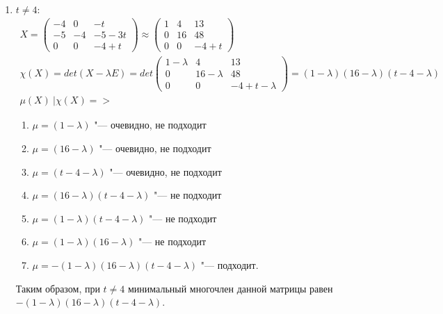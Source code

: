 \begin{enumerate}
    \item $t \ne 4:$
        \begin{gather*}
            X = \begin{pmatrix}
                -4 & 0 & -t\\
                -5 & -4 & -5-3t\\
                0 & 0 & -4+t
            \end{pmatrix} \approx \begin{pmatrix}
                1 & 4 & 13\\
                0 & 16 & 48\\
                0 & 0 & -4+t
            \end{pmatrix}\\
            \chi(X) = det(X - \lambda E) = det\begin{pmatrix}
                1- \lambda & 4 & 13\\
                0 & 16 - \lambda & 48\\
                0 & 0 & -4+t - \lambda
            \end{pmatrix} = (1 - \lambda)(16 - \lambda)(t-4-\lambda)\\
            \mu(X) \ | \chi(X) =>
        \end{gather*}
        \begin{enumerate}
            \item $\mu = (1 - \lambda)$ "--- очевидно, не подходит
            \item $\mu = (16 - \lambda)$ "--- очевидно, не подходит
            \item $\mu = (t-4-\lambda)$ "--- очевидно, не подходит
            \item $\mu = (16 - \lambda)(t-4-\lambda)$ "--- не подходит
            \item $\mu = (1 - \lambda)(t-4-\lambda)$ "--- не подходит
            \item $\mu = (1 - \lambda)(16 - \lambda)$ "--- не подходит
            \item $\mu = -(1 - \lambda)(16 - \lambda)(t-4-\lambda)$ "--- подходит.
        \end{enumerate}
        Таким образом, при $t \ne 4$ минимальный многочлен данной матрицы равен $-(1 - \lambda)(16 - \lambda)(t-4-\lambda)$.
\end{enumerate}


